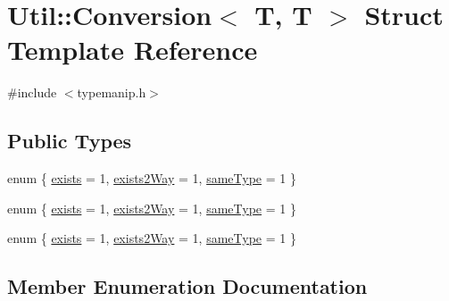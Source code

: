 \hypertarget{structUtil_1_1Conversion_3_01T_00_01T_01_4}{}\section{Util\+:\+:Conversion$<$ T, T $>$ Struct Template Reference}
\label{structUtil_1_1Conversion_3_01T_00_01T_01_4}


{\ttfamily \#include $<$typemanip.\+h$>$}

\subsection*{Public Types}
\begin{DoxyCompactItemize}
\item 
enum \{ \mbox{\hyperlink{structUtil_1_1Conversion_3_01T_00_01T_01_4_afb2d9566210ad105a9e7fe403e1e15c5a3cc820f35b38bc997bcd97ca48baf6f4}{exists}} = 1, 
\mbox{\hyperlink{structUtil_1_1Conversion_3_01T_00_01T_01_4_afb2d9566210ad105a9e7fe403e1e15c5a7640fa077d3c58d0d2ded18bc091c6f0}{exists2\+Way}} = 1, 
\mbox{\hyperlink{structUtil_1_1Conversion_3_01T_00_01T_01_4_afb2d9566210ad105a9e7fe403e1e15c5a1851c5b97270ef2b2f1c3f19e4afa4f0}{same\+Type}} = 1
 \}
\item 
enum \{ \mbox{\hyperlink{structUtil_1_1Conversion_3_01T_00_01T_01_4_afb2d9566210ad105a9e7fe403e1e15c5a3cc820f35b38bc997bcd97ca48baf6f4}{exists}} = 1, 
\mbox{\hyperlink{structUtil_1_1Conversion_3_01T_00_01T_01_4_afb2d9566210ad105a9e7fe403e1e15c5a7640fa077d3c58d0d2ded18bc091c6f0}{exists2\+Way}} = 1, 
\mbox{\hyperlink{structUtil_1_1Conversion_3_01T_00_01T_01_4_afb2d9566210ad105a9e7fe403e1e15c5a1851c5b97270ef2b2f1c3f19e4afa4f0}{same\+Type}} = 1
 \}
\item 
enum \{ \mbox{\hyperlink{structUtil_1_1Conversion_3_01T_00_01T_01_4_afb2d9566210ad105a9e7fe403e1e15c5a3cc820f35b38bc997bcd97ca48baf6f4}{exists}} = 1, 
\mbox{\hyperlink{structUtil_1_1Conversion_3_01T_00_01T_01_4_afb2d9566210ad105a9e7fe403e1e15c5a7640fa077d3c58d0d2ded18bc091c6f0}{exists2\+Way}} = 1, 
\mbox{\hyperlink{structUtil_1_1Conversion_3_01T_00_01T_01_4_afb2d9566210ad105a9e7fe403e1e15c5a1851c5b97270ef2b2f1c3f19e4afa4f0}{same\+Type}} = 1
 \}
\end{DoxyCompactItemize}


\subsection{Member Enumeration Documentation}
\mbox{\label{structUtil_1_1Conversion_3_01T_00_01T_01_4_a629ce5e5258562ceec847abf520c47f4}} 
